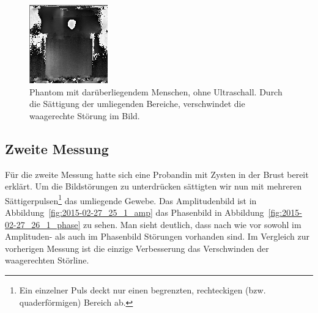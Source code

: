 \documentclass[
    11pt,
    ngerman
]{scrbook}
\begin{document}
\begin{figure}[htbp]
    \centering
    \includegraphics[width=.4\textwidth]{Abbildungen/2014-12-11_37_1_phase_us_mensch_sat.png}
    \caption{%
        Phantom mit darüberliegendem Menschen, ohne Ultraschall. Durch die Sättigung der umliegenden Bereiche, verschwindet die waagerechte Störung im Bild.
    }
    \label{fig:phantom_mensch_sat}
\end{figure}

\subsection{Zweite Messung}

Für die zweite Messung hatte sich eine Probandin mit Zysten in der Brust
bereit erklärt. Um die Bildstörungen zu unterdrücken sättigten wir nun mit
mehreren Sättigerpulsen\footnote{Ein einzelner Puls deckt nur einen
begrenzten, rechteckigen (bzw. quaderförmigen) Bereich ab.} das umliegende
Gewebe. Das Amplitudenbild ist in Abbildung~\ref{fig:2015-02-27_25_1_amp} das
Phasenbild in Abbildung~\ref{fig:2015-02-27_26_1_phase} zu sehen. Man sieht
deutlich, dass nach wie vor sowohl im Amplituden- als auch im Phasenbild
Störungen vorhanden sind. Im Vergleich zur vorherigen Messung ist die einzige
Verbesserung das Verschwinden der waagerechten Störline.
\end{document}

